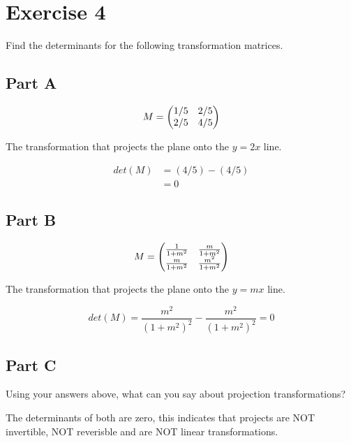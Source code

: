\section*{Exercise 4}

Find the determinants for the following transformation matrices.

\subsection*{Part A}

\[
M = 
 \begin{pmatrix} 
	1/5&2/5\\
	2/5&4/5
 \end{pmatrix} 
\]

The transformation that projects the plane onto the $y = 2x$ line.

\[
	\begin{aligned}	
		det(M) &= (4/5) - (4/5) \\
		&= 0
	\end{aligned}
\]

\subsection*{Part B}

\[
M = 
 \begin{pmatrix} 
	\frac{1}{1+m^2} & \frac{m}{1+m^2} \\
	\frac{m}{1+m^2} & \frac{m^2}{1+m^2}
 \end{pmatrix} 
\]

The transformation that projects the plane onto the $y = mx$ line.

\[det(M) = 
	\frac{m^2}{(1+m^2)^2} - \frac{m^2}{(1+m^2)^2} = 0
\]

\subsection*{Part C}

Using your answers above, what can you say about projection transformations?

The determinants of both are zero, this indicates that projects are NOT invertible, NOT reverisble and are NOT linear transformations.
